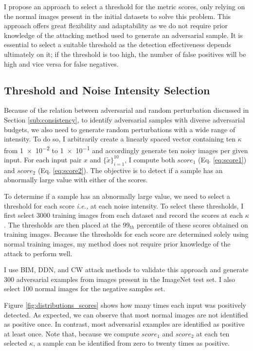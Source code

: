 I propose an approach to select a threshold for the metric scores, only relying
on the normal images present in the initial datasets to solve this problem. This
approach offers great flexibility and adaptability as we do not require prior
knowledge of the attacking method used to generate an adversarial sample. It is
essential to select a suitable threshold as the detection effectiveness depends
ultimately on it; if the threshold is too high, the number of false positives
will be high and vice versa for false negatives.

\subsection{Threshold and Noise Intensity Selection}
\label{sec:selection_of_the_intensity}

Because of the relation between adversarial and random perturbation discussed in
Section \ref{sub:consistency}, to identify adversarial samples with diverse
adversarial budgets, we also need to generate random perturbations with a wide
range of intensity. To do so, I arbitrarily create a linearly spaced vector
containing ten $\kappa$ from \num{1e-2} to \num{1e-1} and accordingly generate
ten noisy images per given input. For each input pair $x$ and
$\{\tilde{x}\}_{i=1}^{10}$, I compute both $score_1$ (Eq. \ref{eq:score1}) and
$score_2$ (Eq. \ref{eq:score2}). The objective is to detect if a sample has an
abnormally large value with either of the scores.

To determine if a sample has an abnormally large value, we need to select a
threshold for each score \emph{i.e.,} at each noise intensity. To select these
thresholds, I first select 3000 training images from each dataset and record the
scores at each $\kappa$. The thresholds are then placed at the $99_{th}$ percentile
of these scores obtained on training images. Because the thresholds for each
score are determined solely using normal training images, my method does not
require prior knowledge of the attack to perform well.

I use BIM, DDN, and CW attack methods to validate this approach and generate 300
adversarial examples from images present in the ImageNet test set. I also select
100 normal images for the negative samples set.

Figure \ref{fig:distributions_scores} shows how many times each input was
positively detected. As expected, we can observe that most normal images are not
identified as positive once. In contrast, most adversarial examples are
identified as positive at least once. Note that, because we compute $score_1$
and $score_2$ at each ten selected $\kappa$, a sample can be identified from
zero to twenty times as positive.

